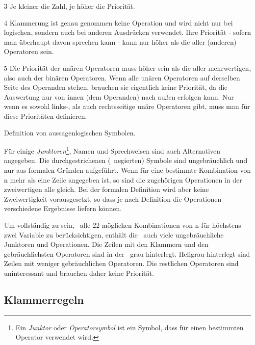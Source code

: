 \begin{table}
\begin{threeparttable}
\begin{tablenotes}
			\item[3] Je kleiner die Zahl, je höher die Priorität.

			\item[4] Klammerung ist genau genommen keine Operation und wird nicht nur bei logischen, sondern auch bei anderen Ausdrücken verwendet. Ihre Priorität - sofern man überhaupt davon sprechen kann - kann nur höher als die aller (anderen) Operatoren sein.

			\item[5] Die Priorität der unären Operatoren muss höher sein als die aller mehrwertigen, also auch der binären Operatoren.
			Wenn alle unären Operatoren auf derselben Seite des Operanden stehen, brauchen sie eigentlich keine Priorität, da die Auswertung nur von innen (dem Operanden) nach außen erfolgen kann.
			Nur wenn es sowohl links-, als auch rechtsseitige unäre Operatoren gibt, muss man für diese Prioritäten definieren.

		\end{tablenotes}
	\end{threeparttable}
	\caption{Definition von aussagenlogischen Symbolen.}
	\label{tab:Symbole}%
\end{table}

Für einige \emph{Junktoren}\footnote{Ein \emph{Junktor} oder \emph{Operatorsymbol} ist ein Symbol, dass für einen bestimmten Operator verwendet wird.}, Namen und Sprechweisen sind auch Alternativen angegeben.
Die durchgestrichenen (\textdh\ negierten) Symbole sind ungebräuchlich und nur aus formalen Gründen aufgeführt.
Wenn für eine bestimmte Kombination von n mehr als eine Zeile angegeben ist, so sind die zugehörigen Operationen in der zweiwertigen  alle gleich.
Bei der formalen Definition wird aber keine Zweiwertigkeit vorausgesetzt, so dass je nach Definition die Operationen verschiedene Ergebnisse liefern können.

Um vollständig zu sein, \textdh\ alle 22 möglichen Kombinationen von n für höchstens zwei Variable zu berücksichtigen, enthält die \tablename\ auch viele ungebräuchliche Junktoren und Operationen.
Die Zeilen mit den Klammern und den gebräuchlichsten Operatoren sind in der \tablename\ grau hinterlegt.
Hellgrau hinterlegt sind Zeilen mit weniger gebräuchlichen Operatoren.
Die restlichen Operatoren sind uninteressant und brauchen daher keine Priorität.

\subsection{Klammerregeln}%
\label{sub:Klammerregeln}


